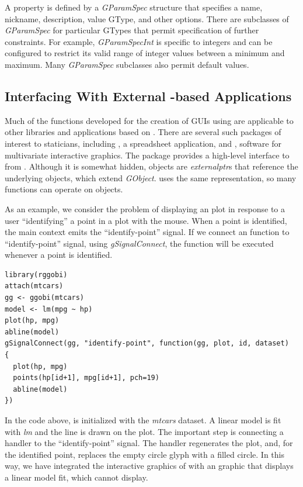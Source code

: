 \documentclass[article]{jss}
\begin{document}
A property is defined by a \emph{GParamSpec} structure that specifies a name, 
nickname, description, value GType, and other options. There are subclasses of 
\emph{GParamSpec} for particular GTypes that permit specification of further 
constraints. For example, \emph{GParamSpecInt} is specific to integers and can be
configured to restrict its valid range of integer values between a minimum and maximum.
Many \emph{GParamSpec} subclasses also permit default values.

\subsection[Interfacing With External GObject-based Applications]{Interfacing With External -based Applications}

Much of the  functions developed for the
creation of GUIs using  are applicable to other libraries
and applications based on . There are several such packages of
interest to staticians, including , a spreadsheet application, and
, software for multivariate interactive graphics. The 
package \citep{rggobi} provides a high-level interface to  from 
. Although it is somewhat hidden,  objects are 
\emph{externalptr}s that reference the underlying  objects, which
extend \emph{GObject}.  uses the same  representation, so
many  functions can operate on  objects.

As an example, we consider the problem of displaying an  plot in
response to a user ``identifying'' a point in a  plot with the mouse.
When a  point is identified, the main  context emits
the ``identify-point'' signal. If we connect an  function to
``identify-point'' signal, using \emph{gSignalConnect}, the function will be
executed whenever a point is identified. 
\begin{verbatim}
library(rggobi)
attach(mtcars)
gg <- ggobi(mtcars)
model <- lm(mpg ~ hp)
plot(hp, mpg)
abline(model)
gSignalConnect(gg, "identify-point", function(gg, plot, id, dataset)
{
  plot(hp, mpg)
  points(hp[id+1], mpg[id+1], pch=19)
  abline(model)
})
\end{verbatim}
In the code above,  is initialized with the \emph{mtcars} dataset. 
A linear model is fit with \emph{lm} and the line is drawn on the plot. The 
important step is connecting a handler to the ``identify-point'' signal. The
handler regenerates the  plot, and, for the identified point, 
replaces the empty circle glyph with a filled circle.
In this way, we have integrated the interactive graphics of  with an
 graphic that displays a linear model fit, which  cannot
display.
\end{document}
